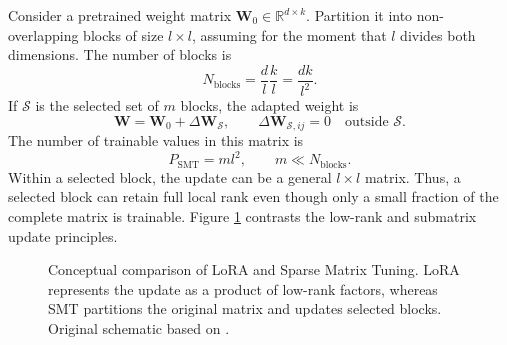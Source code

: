 Consider a pretrained weight matrix
$\mathbf{W}_0\in\mathbb{R}^{d\times k}$. Partition it into non-overlapping
blocks of size $l\times l$, assuming for the moment that $l$ divides both
dimensions. The number of blocks is
\begin{equation}
    N_{\mathrm{blocks}}
    =
    \frac{d}{l}\frac{k}{l}
    =
    \frac{dk}{l^2}.
    \label{eq:smt-number-blocks}
\end{equation}
If $\mathcal{S}$ is the selected set of $m$ blocks, the adapted weight is
\begin{equation}
    \mathbf{W}
    =
    \mathbf{W}_0+\Delta\mathbf{W}_{\mathcal{S}},
    \qquad
    \Delta\mathbf{W}_{\mathcal{S},ij}=0
    \quad\text{outside }\mathcal{S}.
    \label{eq:smt-sparse-update}
\end{equation}
The number of trainable values in this matrix is
\begin{equation}
    P_{\mathrm{SMT}}=ml^2,
    \qquad
    m\ll N_{\mathrm{blocks}}.
    \label{eq:smt-parameter-count}
\end{equation}
Within a selected block, the update can be a general $l\times l$ matrix.
Thus, a selected block can retain full local rank even though only a small
fraction of the complete matrix is trainable. Figure
\ref{fig:lora-versus-smt} contrasts the low-rank and submatrix update
principles.

\begin{figure}[htbp]
    \centering
    
    \caption{Conceptual comparison of LoRA and Sparse Matrix Tuning. LoRA
    represents the update as a product of low-rank factors, whereas SMT
    partitions the original matrix and updates selected blocks. Original
    schematic based on \textcite{he2025smt}.}
    \label{fig:lora-versus-smt}
\end{figure}

